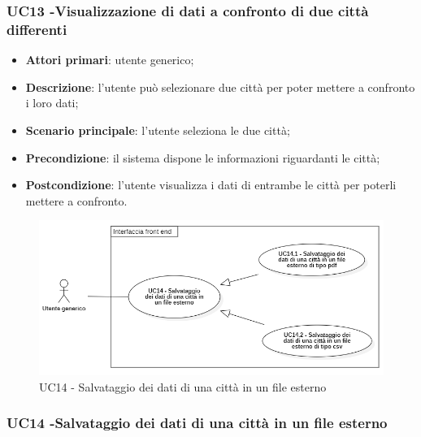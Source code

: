 \subsubsection{UC13 -Visualizzazione di dati a confronto di due città differenti}\label{CasiDUsoCasiDUsoFacoltativiTraUnUtenteEIlFrontEndElencoCasiDUsoUC13VisualizzazioneDiDatiAConfrontoDiDueCittaDifferenti}

\begin{itemize}
	\item \textbf{Attori primari}: utente generico;
	\item \textbf{Descrizione}: l’utente può selezionare due città per poter mettere a confronto i loro dati;
	\item \textbf{Scenario principale}: l’utente seleziona le due città;
	\item \textbf{Precondizione}: il sistema dispone le informazioni riguardanti le città;
	\item \textbf{Postcondizione}: l'utente visualizza i dati di entrambe le città per poterli mettere a confronto.
\end{itemize}



\begin{center}
	\begin{figure}[H]
		\centering\includegraphics[scale=0.7]{../immagini/attori_casi/uc14.png}
		\caption{UC14 - Salvataggio dei dati di una città in un file esterno}
	\end{figure}
\end{center}


\subsubsection{UC14 -Salvataggio dei dati di una città in un file esterno}\label{CasiDUsoCasiDUsoFacoltativiTraUnUtenteEIlFrontEndElencoCasiDUsoUC14SalvataggioDeiDatiDiUnaCittaInUnFileEsterno}


